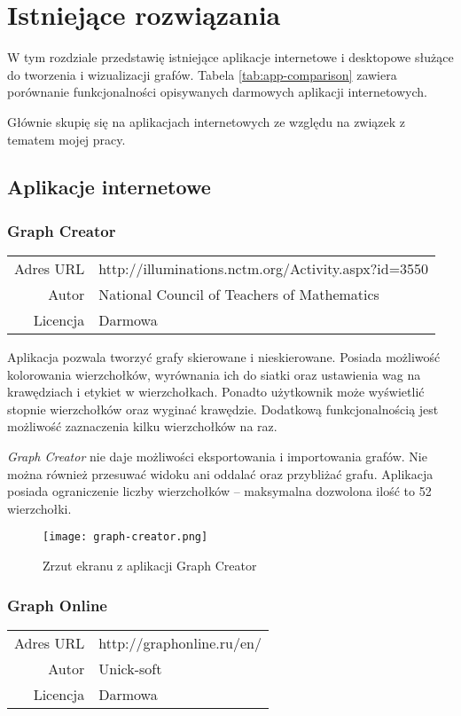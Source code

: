 \chapter{Istniejące rozwiązania}

W tym rozdziale przedstawię istniejące aplikacje internetowe \cite{mathex} i desktopowe służące do tworzenia i wizualizacji grafów. Tabela \ref{tab:app-comparison} zawiera porównanie funkcjonalności opisywanych darmowych aplikacji internetowych. 

Głównie skupię się na aplikacjach internetowych ze względu na związek z tematem mojej pracy. 

\section{Aplikacje internetowe}

\subsection*{Graph Creator}
\bigskip
\noindent\begin{tabularx}{\textwidth}{r|X|}
\cline{2-2}
  Adres URL & http://illuminations.nctm.org/Activity.aspx?id=3550 \\ 
\cline{2-2}
 Autor & National Council of Teachers of Mathematics \\ 
\cline{2-2}
 Licencja & Darmowa\\  
\cline{2-2}
\end{tabularx} 
\bigskip

Aplikacja pozwala tworzyć grafy skierowane i nieskierowane. Posiada możliwość kolorowania wierzchołków, wyrównania ich do siatki oraz ustawienia wag na krawędziach i etykiet w wierzchołkach. Ponadto użytkownik może wyświetlić stopnie wierzchołków oraz wyginać krawędzie. Dodatkową funkcjonalnością jest możliwość zaznaczenia kilku wierzchołków na raz. 

\textit{Graph Creator} nie daje możliwości eksportowania i importowania grafów. Nie można również przesuwać widoku ani oddalać oraz przybliżać grafu. Aplikacja posiada ograniczenie liczby wierzchołków -- maksymalna dozwolona ilość to 52 wierzchołki.

\begin{figure}[H]
\caption{Zrzut ekranu z aplikacji Graph Creator}
\centering
\texttt{[image: graph-creator.png]}
\end{figure}

\subsection*{Graph Online}
\bigskip
\noindent\begin{tabularx}{\textwidth}{r|X|}
\cline{2-2}
  Adres URL & http://graphonline.ru/en/ \\ 
\cline{2-2}
 Autor & Unick-soft \\ 
\cline{2-2}
 Licencja & Darmowa\\  
\cline{2-2}
\end{tabularx} 
\bigskip

